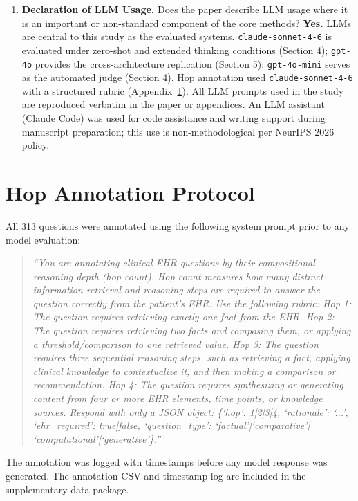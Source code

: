 \documentclass{article}
\begin{document}
\begin{enumerate}
\item \textbf{Declaration of LLM Usage.}
Does the paper describe LLM usage where it is an important or non-standard
component of the core methods?
\textbf{Yes.} LLMs are central to this study as the evaluated systems.
\texttt{claude-sonnet-4-6} is evaluated under zero-shot and extended
thinking conditions (Section 4); \texttt{gpt-4o} provides the
cross-architecture replication (Section 5); \texttt{gpt-4o-mini} serves as
the automated judge (Section 4). Hop annotation used \texttt{claude-sonnet-4-6}
with a structured rubric (Appendix~\ref{app:annotation}). All LLM prompts
used in the study are reproduced verbatim in the paper or appendices.
An LLM assistant (Claude Code) was used for code assistance and writing
support during manuscript preparation; this use is non-methodological per
NeurIPS 2026 policy.

\end{enumerate}

\section{Hop Annotation Protocol}
\label{app:annotation}

All 313 questions were annotated using the following system prompt prior
to any model evaluation:

\begin{quote}
\small
\textit{``You are annotating clinical EHR questions by their compositional
reasoning depth (hop count). Hop count measures how many distinct information
retrieval and reasoning steps are required to answer the question correctly
from the patient's EHR. Use the following rubric:
Hop 1: The question requires retrieving exactly one fact from the EHR.
Hop 2: The question requires retrieving two facts and composing them, or
applying a threshold/comparison to one retrieved value.
Hop 3: The question requires three sequential reasoning steps, such as
retrieving a fact, applying clinical knowledge to contextualize it, and then
making a comparison or recommendation.
Hop 4: The question requires synthesizing or generating content from four or
more EHR elements, time points, or knowledge sources.
Respond with only a JSON object: \{`hop': 1|2|3|4, `rationale': `...',
`ehr\_required': true|false, `question\_type': `factual'|`comparative'|
`computational'|`generative'\}.''
}
\end{quote}

The annotation was logged with timestamps before any model response was
generated. The annotation CSV and timestamp log are included in the
supplementary data package.
\end{document}

